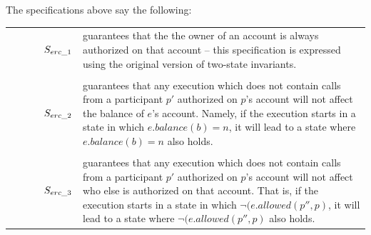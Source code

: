 The specifications above say the following:
\\
\begin{tabular}{ll}
\begin{minipage}{.10\textwidth}
$\strut \ \ \ \ \ \ \ \ \ \   S_{erc\_1}$
\end{minipage}
&
\begin{minipage}{.85\textwidth}
guarantees that the the owner of an account is always authorized on that account -- this specification is expressed using the original version of two-state invariants.
\end{minipage}
\\
\\
\begin{minipage}{.10\textwidth}
$\strut \ \ \ \ \ \ \ \ \ \   S_{erc\_2}$ 
\end{minipage}
&
\begin{minipage}{.85\textwidth}
guarantees that any execution which does not contain calls from a participant $p'$ authorized on $p$'s account will not affect the balance of $e$'s account. Namely, if the execution starts in a state in which $ e.balance(b)=n$, it will lead to a state where $ e.balance(b)=n$ also holds.
\end{minipage}
\\
\\
\begin{minipage}{.10\textwidth}
$\strut \ \ \ \ \ \ \ \ \ \   S_{erc\_3}$ 
\end{minipage}
&
\begin{minipage}{.85\textwidth}
guarantees that any execution which does not contain calls from a participant $p'$ authorized on $p$'s account will not affect who else is authorized on that account. That is, if the execution starts in a state in which $ \neg (e.allowed(p'',p)$, it will lead to a state where $ \neg (e.allowed(p'',p)$ also holds.
\end{minipage}
\end{tabular}


